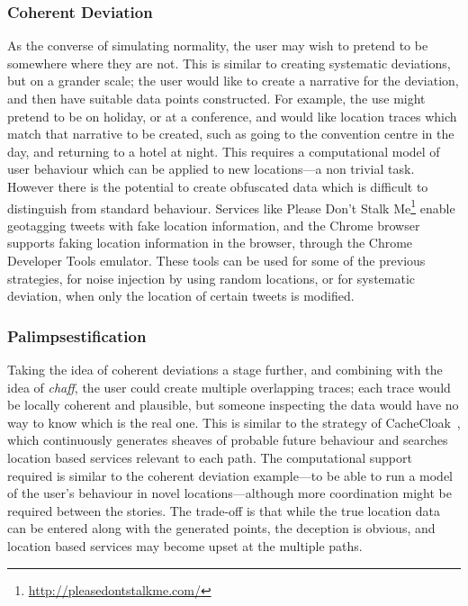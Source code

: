 \documentclass{IOS-Book-Article}     %
\newcommand{\tbox}[3][red]{{
\color{#1}\noindent{
   \fbox{\scriptsize{ {\bf #2} \textsl{#3}}}
   \vspace{2pt}
}
}}
\newcommand{\todo}[1]{\tbox{TODO:}{#1}}
\begin{document}
\subsubsection{Coherent Deviation}
As the converse of simulating normality, the user may wish to pretend to be
somewhere where they are not. 
This is similar
to creating systematic deviations, but on a grander scale; the user would like
to create a narrative for the deviation, and then have suitable data points
constructed. For example, the use might pretend to be on holiday, or at a
conference, and would like location traces which match that narrative to be
created, such as going to the convention centre in the day, and returning to a
hotel at night. This requires a computational model of user behaviour which can
be applied to new locations---a non trivial task. However there is the potential
to create obfuscated data which is difficult to distinguish from standard
behaviour. Services like Please Don't Stalk 
Me\footnote{\url{http://pleasedontstalkme.com/}} enable geotagging tweets 
with fake location information, and the Chrome browser supports faking location 
information in the browser, through the Chrome Developer Tools emulator. These 
tools can be used for some of the previous strategies, for noise injection by 
using random locations, or for systematic deviation, when only the location of 
certain tweets is modified.

\subsubsection{Palimpsestification}
Taking the idea of coherent deviations a stage further, and combining with the
idea of \emph{chaff}, the user could create multiple overlapping traces; each
trace would be locally coherent and plausible, but someone inspecting the data would have no way to know which is the real one.
This is similar to the strategy of 
CacheCloak~\cite{Meyerowitz:2009:HSF:1614320.1614358}, which
continuously generates sheaves of probable future behaviour and searches
location based services relevant to each  path. The computational support
required is similar to the coherent deviation example---to be able to run a
model of the user's behaviour in novel locations---although more coordination
might be required between the stories. The trade-off is that while the true
location data can be entered along with the generated points, the deception is
obvious, and location based services may become upset at the multiple paths.
\end{document}
